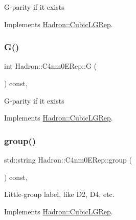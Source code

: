 G-\/parity if it exists 

Implements \mbox{\hyperlink{structHadron_1_1CubicLGRep_ace26f7b2d55e3a668a14cb9026da5231}{Hadron\+::\+Cubic\+L\+G\+Rep}}.

\mbox{\label{structHadron_1_1C4nm0ERep_aeed131ece7b7c5203a64ac3591c75f59}} 
\subsubsection{\texorpdfstring{G()}{G()}\hspace{0.1cm}{\footnotesize\ttfamily [2/2]}}
{\footnotesize\ttfamily int Hadron\+::\+C4nm0\+E\+Rep\+::G (\begin{DoxyParamCaption}{ }\end{DoxyParamCaption}) const\hspace{0.3cm}{\ttfamily [inline]}, {\ttfamily [virtual]}}

G-\/parity if it exists 

Implements \mbox{\hyperlink{structHadron_1_1CubicLGRep_ace26f7b2d55e3a668a14cb9026da5231}{Hadron\+::\+Cubic\+L\+G\+Rep}}.

\mbox{\label{structHadron_1_1C4nm0ERep_a0d17268ef31fa011daabf7af62deec34}} 
\subsubsection{\texorpdfstring{group()}{group()}\hspace{0.1cm}{\footnotesize\ttfamily [1/2]}}
{\footnotesize\ttfamily std\+::string Hadron\+::\+C4nm0\+E\+Rep\+::group (\begin{DoxyParamCaption}{ }\end{DoxyParamCaption}) const\hspace{0.3cm}{\ttfamily [inline]}, {\ttfamily [virtual]}}

Little-\/group label, like D2, D4, etc. 

Implements \mbox{\hyperlink{structHadron_1_1CubicLGRep_a9bdb14b519a611d21379ed96a3a9eb41}{Hadron\+::\+Cubic\+L\+G\+Rep}}.

\mbox{\label{structHadron_1_1C4nm0ERep_a0d17268ef31fa011daabf7af62deec34}} 
